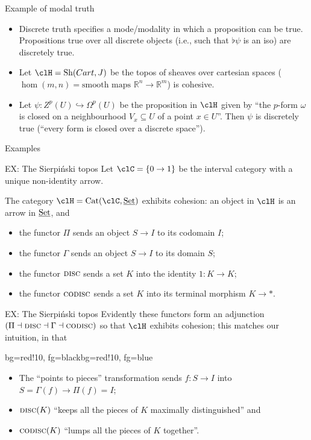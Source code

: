\documentclass[presentation,handout]{beamer}
\begin{document}
%
%
%
%
%
%
%
\begin{frame}{Example of modal truth}
  \begin{itemize}
    \item<+-> Discrete truth specifies a \alert{mode/modality} in which a proposition can be true. Propositions true over all discrete objects (i.e., such that $\flat\psi$ is an iso) are discretely true.
    \item<+-> Let $\clH = \text{Sh}(Cart,J)$ be the topos of sheaves over cartesian spaces ($\hom(m,n) = \text{smooth maps }\mathbb{R}^n\to \mathbb{R}^m$) is cohesive. \item<+-> Let $\psi\colon Z^p(U) \hookrightarrow \Omega^p(U)$ be the proposition in $\clH$ given by ``the $p$-form $\omega$ is closed on a neighbourhood $V_x\subseteq U$ of a point $x\in U$''. Then $\psi$ is discretely true (``every form is closed over a discrete space'').
  \end{itemize}
\end{frame}
%
%
%
%
%
%
%
\begin{frame}
  \Huge
  \centering
  Examples
\end{frame}
%
%
%
%
%
%
%
\begin{frame}{EX: The Sierpiński topos}
  Let $\clC = \{0\to 1\}$ be the interval category with a unique non-identity arrow.
  \onslide<+->
  
  \medskip
  
  The category $\clH = \text{Cat}(\clC,\Set)$ exhibits cohesion: an object in $\clH$ is an arrow in $\underline{\text{Set}}$, and
  \begin{itemize}
    \item<+-> the functor \alert{$\Pi$} sends an object $S\to I$ to its \alert{codomain} $I$;
    \item<+-> the functor \alert{$\Gamma$} sends an object $S\to I$ to its \alert{domain} $S$;
    \item<+-> the functor \alert{$\textsc{disc}$} sends a set $K$ into the \alert{identity} $1\colon K\to K$;
    \item<+-> the functor \alert{$\textsc{codisc}$} sends a set $K$ into its \alert{terminal} morphism $K\to *$.
  \end{itemize}
\end{frame}
%
%
%
%
%
%
%
\begin{frame}{EX: The Sierpiński topos}
  Evidently these functors form an adjunction $(\Pi\dashv\textsc{disc}\dashv\Gamma\dashv\textsc{codisc})$ so that $\clH$ exhibits cohesion; this matches our intuition, in that
  \begin{variableblock}{}{bg=red!10, fg=black}{bg=red!10, fg=blue}
    \begin{itemize}
      \item The ``points to pieces'' transformation sends $f : S\to I$ into $S = \Gamma(f) \to \Pi(f)=I$;
      \item $\textsc{disc}(K)$ ``keeps all the pieces of $K$ maximally distinguished'' and
      \item $\textsc{codisc}(K)$ ``lumps all the pieces of $K$ together''.
    \end{itemize}
  \end{variableblock}
\end{frame}
\end{document}
